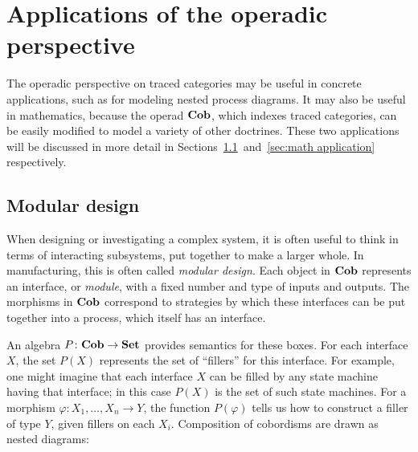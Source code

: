 \documentclass[12pt,oneside,article,draft]{memoir}
\begin{document}
\section{Applications of the operadic perspective}

The operadic perspective on traced categories may be useful in concrete applications, such as for modeling nested process diagrams.
It may also be useful in mathematics, because the operad $\mathbf{Cob}$, which indexes traced categories, can be easily modified to model a variety of other doctrines.
These two applications will be discussed in more detail in Sections~\ref{sec:modular}~and~\ref{sec:math application} respectively.

\subsection{Modular design}\label{sec:modular}

When designing or investigating a complex system, it is often useful to think in terms of interacting subsystems, put together to make a larger whole.
In manufacturing, this is often called \emph{modular design}.
Each object in $\mathbf{Cob}$ represents an interface, or \emph{module}, with a fixed number and type of inputs and outputs.
The morphisms in $\mathbf{Cob}$ correspond to strategies by which these interfaces can be put together into a process, which itself has an interface.

An algebra $P\colon\mathbf{Cob}\to\mathbf{Set}$ provides semantics for these boxes.
For each interface $X$, the set $P(X)$ represents the set of ``fillers'' for this interface.
For example, one might imagine that each interface $X$ can be filled by any state machine having that interface; in this case $P(X)$ is the set of such state machines.
For a morphism $\varphi\colon X_1,\ldots,X_n\to Y$, the function $P(\varphi)$ tells us how to construct a filler of type $Y$, given fillers on each $X_i$.
Composition of cobordisms are drawn as nested diagrams:
\end{document}
